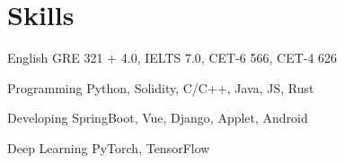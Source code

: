 \documentclass[12pt,letterpaper]{report}
\begin{document}

    \section*{Skills}
    \begin{tablist}
        \item[English] \tab{}\tab{}GRE 321 + 4.0, IELTS 7.0, CET-6 566, CET-4 626
        \item[Programming] \tab{}Python, Solidity, C/C++, Java, JS, Rust
        \item[Developing] \tab{}SpringBoot, Vue, Django, Applet, Android
        \item[Deep Learning] \tab{}PyTorch, TensorFlow
    \end{tablist}
\end{document}
